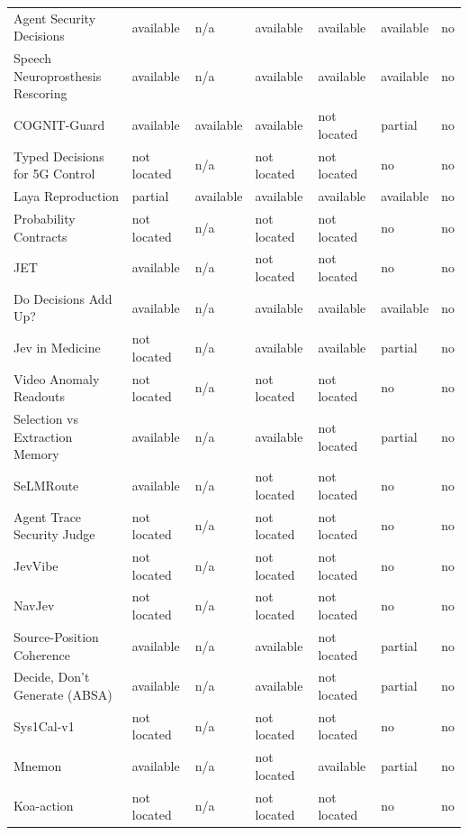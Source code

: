 \begin{table}[tbp]
\begin{tabularx}{\linewidth}{Xllllll}
Agent Security Decisions & available & n/\allowbreak{}a & available & available & available & no \\
Speech Neuroprosthesis Rescoring & available & n/\allowbreak{}a & available & available & available & no \\
COGNIT-Guard & available & available & available & not located & partial & no \\
Typed Decisions for 5G Control & not located & n/\allowbreak{}a & not located & not located & no & no \\
Laya Reproduction & partial & available & available & available & available & no \\
Probability Contracts & not located & n/\allowbreak{}a & not located & not located & no & no \\
JET & available & n/\allowbreak{}a & not located & not located & no & no \\
Do Decisions Add Up? & available & n/\allowbreak{}a & available & available & available & no \\
Jev in Medicine & not located & n/\allowbreak{}a & available & available & partial & no \\
Video Anomaly Readouts & not located & n/\allowbreak{}a & not located & not located & no & no \\
Selection vs Extraction Memory & available & n/\allowbreak{}a & available & not located & partial & no \\
SeLMRoute & available & n/\allowbreak{}a & not located & not located & no & no \\
Agent Trace Security Judge & not located & n/\allowbreak{}a & not located & not located & no & no \\
JevVibe & not located & n/\allowbreak{}a & not located & not located & no & no \\
NavJev & not located & n/\allowbreak{}a & not located & not located & no & no \\
Source-Position Coherence & available & n/\allowbreak{}a & available & not located & partial & no \\
Decide, Don’t Generate (ABSA) & available & n/\allowbreak{}a & available & not located & partial & no \\
Sys1Cal-v1 & not located & n/\allowbreak{}a & not located & not located & no & no \\
Mnemon & available & n/\allowbreak{}a & not located & available & partial & no \\
Koa-action & not located & n/\allowbreak{}a & not located & not located & no & no \\

\end{tabularx}
\end{table}
